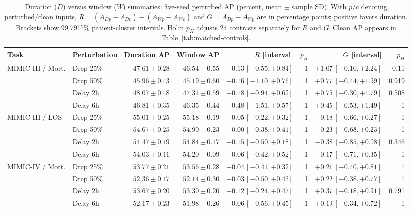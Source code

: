\begin{table}[!t]
\centering\footnotesize
\renewcommand{\arraystretch}{1.0}
\setlength{\tabcolsep}{3pt}
\caption{Duration ($D$) versus window ($W$) summaries: five-seed perturbed AP (percent, mean $\pm$ sample SD). With $p/c$ denoting perturbed/clean inputs, $R=(A_{Dp}-A_{Dc})-(A_{Wp}-A_{Wc})$ and $G=A_{Dp}-A_{Wp}$ are in percentage points; positive favors duration. Brackets show 99.7917\% patient-cluster intervals. Holm $p_H$ adjusts 24 contrasts separately for $R$ and $G$. Clean AP appears in Table~\ref{tab:matched-controls}.}
\label{tab:aggregation-stress}
\begin{tabular}{llrrrrrr}
\toprule
Task & Perturbation & Duration AP & Window AP & $R$ [interval] & $p_H$ & $G$ [interval] & $p_H$ \\
\midrule
MIMIC-III / Mort. & Drop 25\% & $47.61\pm0.28$ & $46.54\pm0.55$ & $+0.13\ [-0.55,+0.84]$ & 1 & $+1.07\ [-0.10,+2.24]$ & 0.11 \\
 & Drop 50\% & $45.96\pm0.43$ & $45.19\pm0.60$ & $-0.16\ [-1.10,+0.76]$ & 1 & $+0.77\ [-0.44,+1.99]$ & 0.919 \\
 & Delay 2h & $48.07\pm0.48$ & $47.31\pm0.59$ & $-0.18\ [-0.94,+0.62]$ & 1 & $+0.76\ [-0.30,+1.79]$ & 0.508 \\
 & Delay 6h & $46.81\pm0.35$ & $46.35\pm0.44$ & $-0.48\ [-1.51,+0.57]$ & 1 & $+0.45\ [-0.53,+1.49]$ & 1 \\
\midrule
MIMIC-III / LOS & Drop 25\% & $55.01\pm0.25$ & $55.18\pm0.19$ & $+0.05\ [-0.22,+0.32]$ & 1 & $-0.18\ [-0.66,+0.27]$ & 1 \\
 & Drop 50\% & $54.67\pm0.25$ & $54.90\pm0.23$ & $+0.00\ [-0.38,+0.41]$ & 1 & $-0.23\ [-0.68,+0.23]$ & 1 \\
 & Delay 2h & $54.47\pm0.19$ & $54.84\pm0.17$ & $-0.15\ [-0.50,+0.18]$ & 1 & $-0.38\ [-0.85,+0.08]$ & 0.346 \\
 & Delay 6h & $54.03\pm0.11$ & $54.20\pm0.09$ & $+0.06\ [-0.42,+0.52]$ & 1 & $-0.17\ [-0.71,+0.35]$ & 1 \\
\midrule
MIMIC-IV / Mort. & Drop 25\% & $53.77\pm0.21$ & $53.56\pm0.28$ & $-0.04\ [-0.41,+0.32]$ & 1 & $+0.21\ [-0.40,+0.81]$ & 1 \\
 & Drop 50\% & $52.36\pm0.17$ & $52.14\pm0.30$ & $-0.03\ [-0.50,+0.43]$ & 1 & $+0.22\ [-0.38,+0.77]$ & 1 \\
 & Delay 2h & $53.67\pm0.20$ & $53.30\pm0.20$ & $+0.12\ [-0.24,+0.47]$ & 1 & $+0.37\ [-0.18,+0.91]$ & 0.791 \\
 & Delay 6h & $52.17\pm0.23$ & $51.98\pm0.26$ & $-0.06\ [-0.56,+0.45]$ & 1 & $+0.19\ [-0.34,+0.72]$ & 1 \\

\end{tabular}
\end{table}
